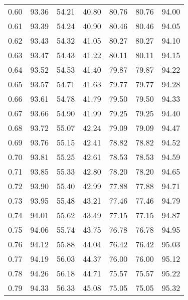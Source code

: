 \begin{tabular}{|c|c|c|c|c|c|c|}
      0.60 &     93.36 &     54.21 &      40.80 &   80.76 &      80.76 &         94.00 \\
      0.61 &     93.39 &     54.24 &      40.90 &   80.46 &      80.46 &         94.05 \\
      0.62 &     93.43 &     54.32 &      41.05 &   80.27 &      80.27 &         94.10 \\
      0.63 &     93.47 &     54.43 &      41.22 &   80.11 &      80.11 &         94.15 \\
      0.64 &     93.52 &     54.53 &      41.40 &   79.87 &      79.87 &         94.22 \\
      0.65 &     93.57 &     54.71 &      41.63 &   79.77 &      79.77 &         94.28 \\
      0.66 &     93.61 &     54.78 &      41.79 &   79.50 &      79.50 &         94.33 \\
      0.67 &     93.66 &     54.90 &      41.99 &   79.25 &      79.25 &         94.40 \\
      0.68 &     93.72 &     55.07 &      42.24 &   79.09 &      79.09 &         94.47 \\
      0.69 &     93.76 &     55.15 &      42.41 &   78.82 &      78.82 &         94.52 \\
      0.70 &     93.81 &     55.25 &      42.61 &   78.53 &      78.53 &         94.59 \\
      0.71 &     93.85 &     55.33 &      42.80 &   78.20 &      78.20 &         94.65 \\
      0.72 &     93.90 &     55.40 &      42.99 &   77.88 &      77.88 &         94.71 \\
      0.73 &     93.95 &     55.48 &      43.21 &   77.46 &      77.46 &         94.79 \\
      0.74 &     94.01 &     55.62 &      43.49 &   77.15 &      77.15 &         94.87 \\
      0.75 &     94.06 &     55.74 &      43.75 &   76.78 &      76.78 &         94.95 \\
      0.76 &     94.12 &     55.88 &      44.04 &   76.42 &      76.42 &         95.03 \\
      0.77 &     94.19 &     56.03 &      44.37 &   76.00 &      76.00 &         95.12 \\
      0.78 &     94.26 &     56.18 &      44.71 &   75.57 &      75.57 &         95.22 \\
      0.79 &     94.33 &     56.33 &      45.08 &   75.05 &      75.05 &         95.32 \\

\end{tabular}
